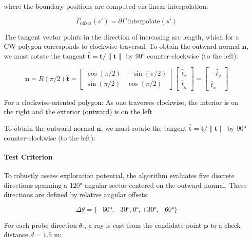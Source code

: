 \documentclass[11pt]{article}
\begin{document}
where the boundary positions are computed via linear interpolation:

\begin{equation}
	\Gamma_{\text{offset}}(s') = \partial\Gamma.\text{interpolate}(s')
\end{equation}

The tangent vector points in the direction of increasing arc length, which for a CW polygon corresponds to clockwise traversal. To obtain the outward normal $\mathbf{n}$, we must rotate the tangent $\hat{\mathbf{t}} = \mathbf{t}/\|\mathbf{t}\|$ by 90° counter-clockwise (to the left):

\begin{equation}
	\mathbf{n} = R(\pi/2) \hat{\mathbf{t}} = 
	\begin{bmatrix} 
		\cos(\pi/2) & -\sin(\pi/2) \\ 
		\sin(\pi/2) & \cos(\pi/2) 
	\end{bmatrix}
	\begin{bmatrix} 
		\hat{t}_x \\ 
		\hat{t}_y 
	\end{bmatrix}
	= 
	\begin{bmatrix} 
		-\hat{t}_y \\ 
		\hat{t}_x 
	\end{bmatrix}
\end{equation}

For a clockwise-oriented polygon: As one traverses clockwise, the interior is on the right and the exterior (outward) is on the left


To obtain the outward normal $\mathbf{n}$, we must rotate the tangent $\hat{\mathbf{t}} = \mathbf{t}/\|\mathbf{t}\|$ by 90° counter-clockwise (to the left):

\paragraph{Test Criterion}

To robustly assess exploration potential, the algorithm evaluates five discrete directions spanning a 120° angular sector centered on the outward normal. These directions are defined by relative angular offsets:

\begin{equation}
	\Delta\theta = \{-60°, -30°, 0°, +30°, +60°\}
\end{equation}


For each probe direction $\theta_i$, a ray is cast from the candidate point $\mathbf{p}$ to a check distance $d = 1.5$ m:
\end{document}
